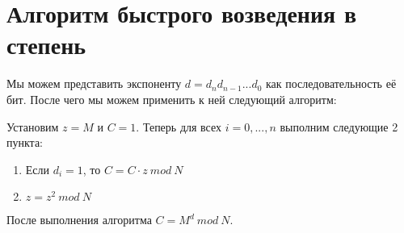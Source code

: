 \documentclass[12pt,a4paper]{scrartcl}
\begin{document}
	
\section{Алгоритм быстрого возведения в степень}

Мы можем представить экспоненту $d=d_nd_{n-1}...d_0$ как последовательность её бит. После чего мы можем применить к ней следующий алгоритм: 

Установим $z=M$ и $C=1$. Теперь для всех $i=0,...,n$ выполним следующие 2 пункта:

\begin{enumerate}
	\item Если $d_i = 1$, то $C=C \cdot z\ mod\ N$
	\item $z = z^2\ mod\ N$
\end{enumerate}

После выполнения алгоритма $C= M^d\ mod\ N$.\\
	
\end{document}
